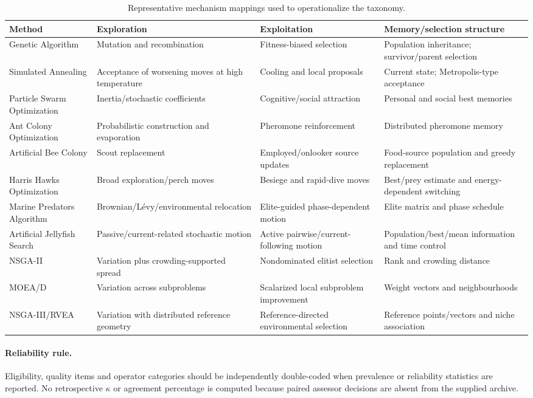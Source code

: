 \documentclass[8pt]{article}
\begin{document}
\begin{table}[h]
\centering\scriptsize
\caption{Representative mechanism mappings used to operationalize the taxonomy.}
\begin{tabular}{P{3.0cm}P{4.0cm}P{4.0cm}P{4.0cm}}
\toprule
Method & Exploration & Exploitation & Memory/selection structure\\
\midrule
Genetic Algorithm & Mutation and recombination & Fitness-biased selection & Population inheritance; survivor/parent selection\\
Simulated Annealing & Acceptance of worsening moves at high temperature & Cooling and local proposals & Current state; Metropolis-type acceptance\\
Particle Swarm Optimization & Inertia/stochastic coefficients & Cognitive/social attraction & Personal and social best memories\\
Ant Colony Optimization & Probabilistic construction and evaporation & Pheromone reinforcement & Distributed pheromone memory\\
Artificial Bee Colony & Scout replacement & Employed/onlooker source updates & Food-source population and greedy replacement\\
Harris Hawks Optimization & Broad exploration/perch moves & Besiege and rapid-dive moves & Best/prey estimate and energy-dependent switching\\
Marine Predators Algorithm & Brownian/L\'evy/environmental relocation & Elite-guided phase-dependent motion & Elite matrix and phase schedule\\
Artificial Jellyfish Search & Passive/current-related stochastic motion & Active pairwise/current-following motion & Population/best/mean information and time control\\
NSGA-II & Variation plus crowding-supported spread & Nondominated elitist selection & Rank and crowding distance\\
MOEA/D & Variation across subproblems & Scalarized local subproblem improvement & Weight vectors and neighbourhoods\\
NSGA-III/RVEA & Variation with distributed reference geometry & Reference-directed environmental selection & Reference points/vectors and niche association\\
\bottomrule
\end{tabular}
\end{table}

\paragraph{Reliability rule.}
Eligibility, quality items and operator categories should be independently double-coded when prevalence or reliability statistics are reported. No retrospective $\kappa$ or agreement percentage is computed because paired assessor decisions are absent from the supplied archive.
\end{document}
